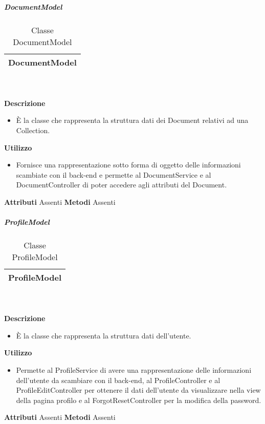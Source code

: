 			\subparagraph{DocumentModel} 
\begin{table}[ht]
\begin{center}
\bgroup
	\setlength{\arrayrulewidth}{0.6mm}
	\def\arraystretch{1}
		\begin{tabular}{ | p{12cm} | }
				\hline  
					\centerline{\textbf{DocumentModel}}
		\\ \hline 
				\hline
				\hline
		
		\end{tabular}
\egroup
\caption{Classe DocumentModel}
\end{center}
\end{table} \textbf{\\ \\ Descrizione}
\begin{itemize}
\item[] È la classe che rappresenta la struttura dati dei Document relativi ad una Collection.
\end{itemize} 
\textbf{Utilizzo}
\begin{itemize}
\item[] Fornisce una rappresentazione sotto forma di oggetto delle informazioni scambiate con il back-end e permette al DocumentService e al DocumentController di poter accedere agli attributi del Document.
\end{itemize}
\textbf{Attributi}
Assenti
\textbf{Metodi}
Assenti

			\subparagraph{ProfileModel} 
\begin{table}[ht]
\begin{center}
\bgroup
	\setlength{\arrayrulewidth}{0.6mm}
	\def\arraystretch{1}
		\begin{tabular}{ | p{12cm} | }
				\hline  
					\centerline{\textbf{ProfileModel}}
		\\ \hline 
				\hline
				\hline
		
		\end{tabular}
\egroup
\caption{Classe ProfileModel}
\end{center}
\end{table} \textbf{\\ \\ Descrizione}
\begin{itemize}
\item[] È la classe che rappresenta la struttura dati dell'utente.
\end{itemize} 
\textbf{Utilizzo}
\begin{itemize}
\item[] Permette al ProfileService di avere una rappresentazione delle informazioni dell'utente da scambiare con il back-end, al ProfileController e al ProfileEditController per ottenere il dati dell'utente da visualizzare nella view della pagina profilo e al ForgotResetController per la modifica della password.
\end{itemize}
\textbf{Attributi}
Assenti
\textbf{Metodi}
Assenti

